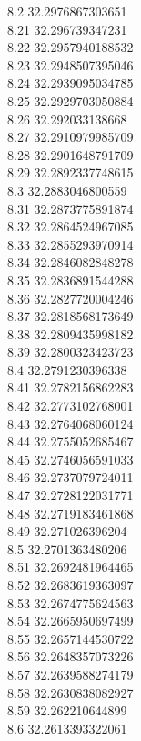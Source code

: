 {8.2	32.2976867303651\\
8.21	32.296739347231\\
8.22	32.2957940188532\\
8.23	32.2948507395046\\
8.24	32.2939095034785\\
8.25	32.2929703050884\\
8.26	32.292033138668\\
8.27	32.2910979985709\\
8.28	32.2901648791709\\
8.29	32.2892337748615\\
8.3	32.2883046800559\\
8.31	32.2873775891874\\
8.32	32.2864524967085\\
8.33	32.2855293970914\\
8.34	32.2846082848278\\
8.35	32.2836891544288\\
8.36	32.2827720004246\\
8.37	32.2818568173649\\
8.38	32.2809435998182\\
8.39	32.2800323423723\\
8.4	32.2791230396338\\
8.41	32.2782156862283\\
8.42	32.2773102768001\\
8.43	32.2764068060124\\
8.44	32.2755052685467\\
8.45	32.2746056591033\\
8.46	32.2737079724011\\
8.47	32.2728122031771\\
8.48	32.2719183461868\\
8.49	32.271026396204\\
8.5	32.2701363480206\\
8.51	32.2692481964465\\
8.52	32.2683619363097\\
8.53	32.2674775624563\\
8.54	32.2665950697499\\
8.55	32.2657144530722\\
8.56	32.2648357073226\\
8.57	32.2639588274179\\
8.58	32.2630838082927\\
8.59	32.262210644899\\
8.6	32.2613393322061\\
}
